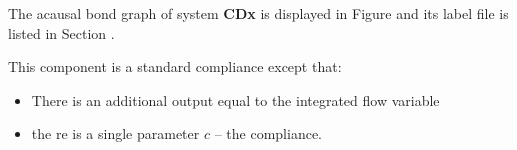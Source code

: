 

   The acausal bond graph of system \textbf{CDx} is
   displayed in Figure  and its label
   file is listed in Section .

   This component is a standard compliance except that:
   \begin{itemize}
   \item There is an additional output equal to the integrated flow
     variable
   \item the re is a single parameter $c$ -- the compliance.
   \end{itemize}

